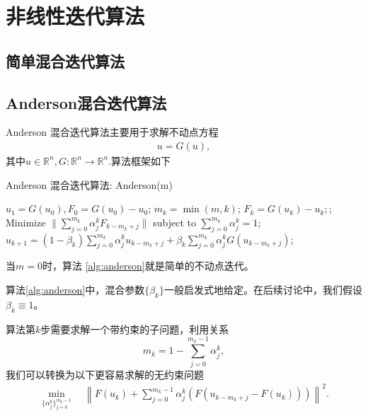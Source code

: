 \section{非线性迭代算法}

\subsection{简单混合迭代算法}

\subsection{Anderson混合迭代算法}
Anderson 混合迭代算法主要用于求解不动点方程
	\begin{align*}
	u = G(u),
	\end{align*}
	其中$ u\in\mathbb{R}^n, G:\mathbb{R}^n\rightarrow \mathbb{R}^n. $算法框架如下
	\begin{algorithm}[!pbht]
		\caption{Anderson 混合迭代算法: Anderson(m)}
		\label{alg:anderson}
		\begin{algorithmic}[1]
			\STATE $ u_1 = G(u_0) , F_0 = G(u_0) - u_0$;
				\STATE $ m_k = \min(m, k) $;
				\STATE $ F_k = G(u_k) - u_k; $;
				\STATE Minimize $ \| \sum_{j=0}^{m_k}\alpha_j^kF_{k-m_k+j}\| $ subject to $ \sum_{j=0}^{m_k} \alpha^k_j = 1$;
				\STATE $u_{k+1}  = (1-\beta_k)\sum_{j=0}^{m_k}\alpha^k_ju_{k-m_k+j} + \beta_k\sum_{j=0}^{m_k}\alpha^k_jG(u_{k-m_k+j}) $;
			\ENDFOR			
		\end{algorithmic}
	\end{algorithm}
	\begin{remark}
		当$ m = 0 $时，算法 \ref{alg:anderson}就是简单的不动点迭代。
	\end{remark}
	\begin{remark}
		算法\ref{alg:anderson}中，混合参数$ \{\beta_k\} $一般启发式地给定。在后续讨论中，我们假设$ \beta_k\equiv 1 $。
	\end{remark}

	算法第$ k $步需要求解一个带约束的子问题，利用关系
	\begin{equation*}
	m_k = 1- \sum_{j=0}^{m_k-1} \alpha_j^k,
	\end{equation*}
	我们可以转换为以下更容易求解的无约束问题
	\begin{align}
	\min_{\{\alpha_j^k\}_{j=0}^{m_k-1} }\quad \left\| F(u_k) + \sum_{j=0}^{m_k-1} \alpha_j^k (F(u_{k-m_k+j} - F(u_k))) \right\|^2.
	\end{align}
	
